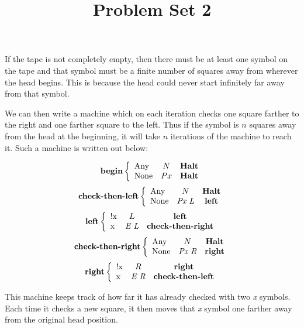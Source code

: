 \documentclass[11pt]{article}
\title{\textbf{Problem Set 2}}
\author{}
\date{}
\newcommand{\?}{\stackrel{?}{=}}
\begin{document}
\maketitle

If the tape is not completely empty, then there must be at least one symbol on the tape and that symbol must be a finite number of squares away from wherever the head begins. This is because the head could never start infinitely far away from that symbol.

We can then write a machine which on each iteration checks one square farther to the right and one farther square to the left. Thus if the symbol is $n$ squares away from the head at the beginning, it will take $n$ iterations of the machine to reach it. Such a machine is written out below:

$$
   \textbf{begin} \left\{
     \begin{array}{l c c r}
       \text{Any} & N & \textbf{Halt}\\
       \text{None} & Px & \textbf{Halt}\\
     \end{array}
   \right.
 $$
 $$
   \textbf{check-then-left} \left\{
     \begin{array}{l c c r}
       \text{Any} & N & \textbf{Halt}\\
       \text{None} & \textit{Px L} & \textbf{left}\\
     \end{array}
   \right.
$$
$$
   \textbf{left} \left\{
     \begin{array}{l c c r}
       \text{!x} & L & \textbf{left}\\
       \text{x} & \textit{E L} & \textbf{check-then-right}\\
     \end{array}
   \right.
$$
  $$
   \textbf{check-then-right} \left\{
     \begin{array}{l c c r}
       \text{Any} & N & \textbf{Halt}\\
       \text{None} & \textit{Px R} & \textbf{right}\\
     \end{array}
   \right.
 $$
$$
   \textbf{right} \left\{
     \begin{array}{l c c r}
       \text{!x} & R & \textbf{right}\\
       \text{x} & \textit{E R} & \textbf{check-then-left}\\
     \end{array}
   \right.
$$

This machine keeps track of how far it has already checked with two \textit{x} symbols. Each time it checks a new square, it then moves that \textit{x} symbol one farther away from the original head position.
\end{document}
